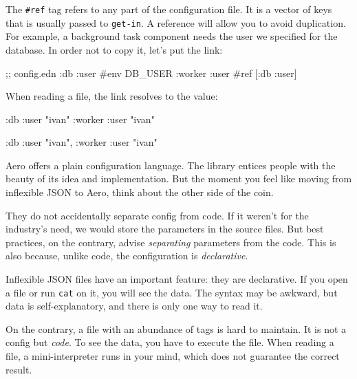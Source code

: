 The \verb|#ref| tag refers to any part of the configuration file. It is a vector of keys that is usually passed to \verb|get-in|. A reference will allow you to avoid duplication. For example, a background task component needs the user we specified for the database. In order not to copy it, let's put the link:

\begin{english}
  \begin{clojure}
;; config.edn
{:db {:user #env DB_USER}
 :worker {:user #ref [:db :user]}}
  \end{clojure}
\end{english}

\noindent
When reading a file, the link resolves to the value:

\ifx\DEVICETYPE\MOBILE

\begin{english}
  \begin{clojure}
{:db {:user "ivan"}
 :worker {:user "ivan"}}
  \end{clojure}
\end{english}

\else

\begin{english}
  \begin{clojure}
{:db {:user "ivan"}, :worker {:user "ivan"}}
  \end{clojure}
\end{english}

\fi

Aero offers a plain configuration language. The library entices people with the beauty of its idea and implementation. But the moment you feel like moving from inflexible JSON to Aero, think about the other side of the coin.


They do not accidentally separate config from code. If it weren't for the industry's need, we would store the parameters in the source files. But best practices, on the contrary, advise \emph{separating} parameters from the code. This is also because, unlike code, the configuration is \emph{declarative}.

Inflexible JSON files have an important feature: they are declarative. If you open a file or run \verb|cat| on it, you will see the data. The syntax may be awkward, but data is self-explanatory, and there is only one way to read it.

On the contrary, a file with an abundance of tags is hard to maintain. It is not a config but \emph{code}. To see the data, you have to execute the file. When reading a file, a mini-interpreter runs in your mind, which does not guarantee the correct result.

